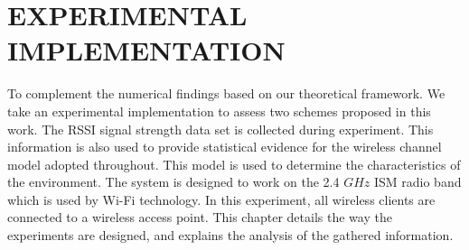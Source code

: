 \chapter{EXPERIMENTAL IMPLEMENTATION}
To complement the numerical findings based on our theoretical framework. We take an experimental implementation to assess two schemes proposed in this work.
The RSSI signal strength data set is collected during experiment. This information is also used to provide statistical evidence for the wireless channel model adopted
throughout. This model is used to determine the characteristics of the environment. The system is designed to work on the 2.4 $GHz$ ISM radio band which is used by Wi-Fi technology. In this experiment, all wireless clients are connected to a wireless access point.
This chapter details the way the experiments are designed, and explains the
analysis of the gathered information.

